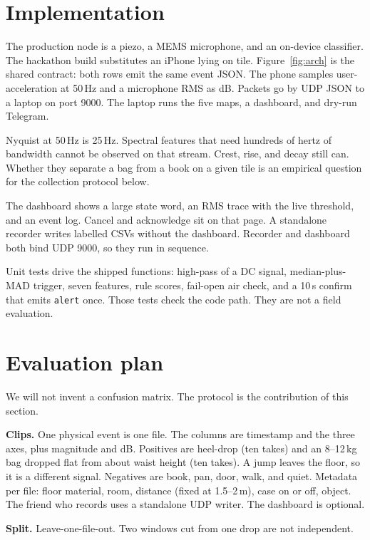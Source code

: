 \documentclass[sigconf]{acmart}
\begin{document}
\section{Implementation}

The production node is a piezo, a MEMS microphone, and an on-device classifier. The hackathon build substitutes an iPhone lying on tile. Figure~\ref{fig:arch} is the shared contract: both rows emit the same event JSON. The phone samples user-acceleration at 50\,Hz and a microphone RMS as dB. Packets go by UDP JSON to a laptop on port 9000. The laptop runs the five maps, a dashboard, and dry-run Telegram.

Nyquist at 50\,Hz is 25\,Hz. Spectral features that need hundreds of hertz of bandwidth cannot be observed on that stream. Crest, rise, and decay still can. Whether they separate a bag from a book on a given tile is an empirical question for the collection protocol below.

The dashboard shows a large state word, an RMS trace with the live threshold, and an event log. Cancel and acknowledge sit on that page. A standalone recorder writes labelled CSVs without the dashboard. Recorder and dashboard both bind UDP 9000, so they run in sequence.

Unit tests drive the shipped functions: high-pass of a DC signal, median-plus-MAD trigger, seven features, rule scores, fail-open air check, and a 10\,s confirm that emits \texttt{alert} once. Those tests check the code path. They are not a field evaluation.

\section{Evaluation plan}

We will not invent a confusion matrix. The protocol is the contribution of this section.

\textbf{Clips.} One physical event is one file. The columns are timestamp and the three axes, plus magnitude and dB. Positives are heel-drop (ten takes) and an 8--12\,kg bag dropped flat from about waist height (ten takes). A jump leaves the floor, so it is a different signal. Negatives are book, pan, door, walk, and quiet. Metadata per file: floor material, room, distance (fixed at 1.5--2\,m), case on or off, object. The friend who records uses a standalone UDP writer. The dashboard is optional.

\textbf{Split.} Leave-one-file-out. Two windows cut from one drop are not independent.
\end{document}
